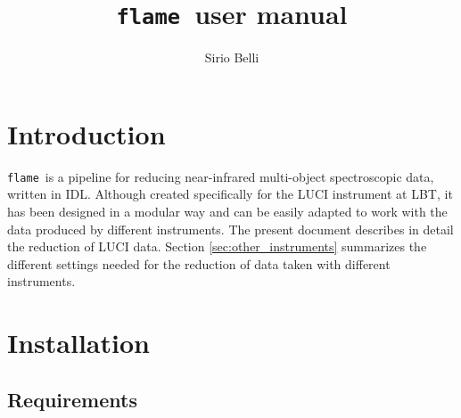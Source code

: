 \documentclass[a4paper, notitlepage]{article}
\newcommand{\flame}{\texttt{flame}}
\begin{document}
\lstset{language=IDL}

\title{\flame\ user manual}
\author{Sirio Belli}
\maketitle





\section{Introduction}
\label{sec:introudction}

\flame\ is a pipeline for reducing near-infrared multi-object spectroscopic data, written in IDL. Although created specifically for the LUCI instrument at LBT, it has been designed in a modular way and can be easily adapted to work with the data produced by different instruments. The present document describes in detail the reduction of LUCI data. Section \ref{sec:other_instruments} summarizes the different settings needed for the reduction of data taken with different instruments.








\section{Installation}
\label{sec:installation}


\subsection{Requirements}
\end{document}
